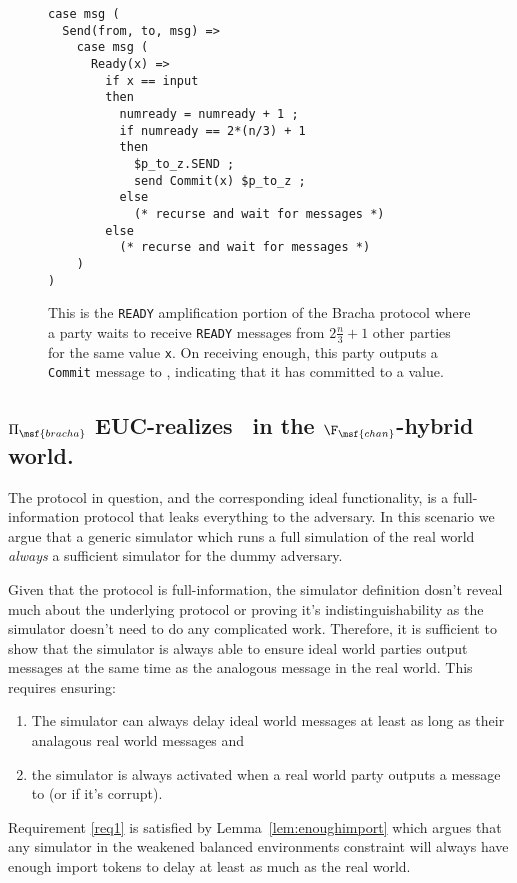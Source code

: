 \begin{figure}
\begin{lstlisting}[basicstyle=\small\ttfamily, frame=single]
case msg (
  Send(from, to, msg) =>
    case msg (
      Ready(x) =>
        if x == input
        then
          numready = numready + 1 ;
          if numready == 2*(n/3) + 1
          then
            $p_to_z.SEND ;
            send Commit(x) $p_to_z ;
          else
            (* recurse and wait for messages *)
        else
          (* recurse and wait for messages *)
    )
)
\end{lstlisting}
\caption{This is the \texttt{READY} amplification portion of the Bracha protocol where a party waits to receive \texttt{READY} messages from $2 \frac{n}{3} + 1$ other parties for the same value \texttt{x}. On receiving enough, this party outputs a \texttt{Commit} message to \Environment, indicating that it has committed to a value.}
\label{fig:nomos:ready}
\end{figure}


\subsection{$\Pi_{\msf{bracha}}$ EUC-realizes \Frbc~in the $\F_{\msf{chan}}$-hybrid world.}
The protocol in question, and the corresponding ideal functionality, is a full-information protocol that leaks everything to the adversary.
In this scenario we argue that a generic simulator which runs a full simulation of the real world \textit{always} a sufficient simulator for the dummy adversary.

Given that the protocol is full-information, the simulator definition dosn't reveal much about the underlying protocol or proving it's indistinguishability as the simulator doesn't need to do any complicated work.
Therefore, it is sufficient to show that the simulator is always able to ensure ideal world parties output messages at the same time as the analogous message in the real world.
This requires ensuring:
\begin{enumerate}
\item \label{req1} The simulator can always delay ideal world messages at least as long as their analagous real world messages and
\item \label{req2} the simulator is always activated when a real world party outputs a message to \Environment (or \Adversary if it's corrupt).
\end{enumerate}

Requirement \ref{req1} is satisfied by Lemma~\ref{lem:enoughimport} which argues that any simulator in the weakened balanced environments constraint will always have enough import tokens to delay at least as much as the real world.

